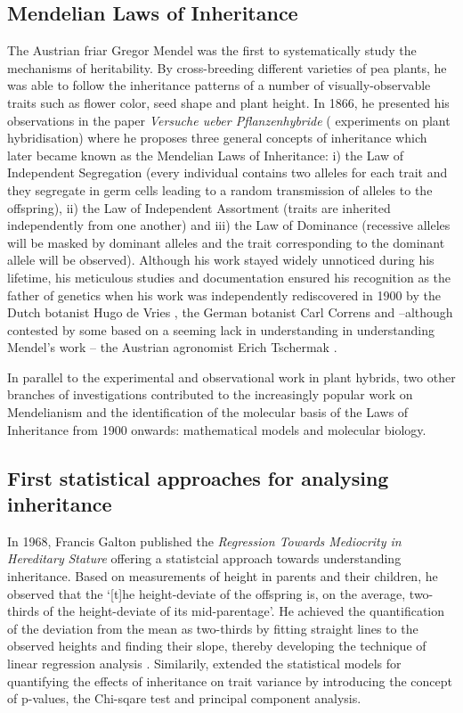 \subsection{Mendelian Laws of Inheritance}
The Austrian friar Gregor Mendel was the first to systematically study the mechanisms of heritability. By cross-breeding different varieties of pea plants, he was able to follow the inheritance patterns of a number of visually-observable traits such as flower color, seed shape and plant height. In 1866, he presented his observations in the paper \textit{Versuche ueber Pflanzenhybride} ( experiments on plant hybridisation) where he proposes three general concepts of inheritance which later became known as the Mendelian Laws of Inheritance: i) the Law of Independent Segregation (every individual contains two alleles for each trait and they segregate in germ cells leading to a random transmission of alleles to the offspring), ii) the Law of Independent Assortment (traits are inherited independently from one another) and iii) the Law of Dominance (recessive alleles will be masked by dominant alleles and the trait corresponding to the dominant allele will be observed). Although his work stayed widely unnoticed during his lifetime, his meticulous studies and documentation ensured his recognition as the father of genetics when his work was independently rediscovered in 1900 by the Dutch  botanist Hugo de Vries \citep{deVries1900,Hannah1950}, the German botanist Carl Correns \citep{Correns1900,Pierncik1950} and --although contested by some based on a seeming lack in understanding in understanding Mendel's work \citep{Monaghan1986,Floyd1987}-- the Austrian agronomist Erich Tschermak \citep{Tschermak1900}. 

In parallel to the experimental and observational work in plant hybrids, two other branches of investigations contributed to the increasingly popular work on Mendelianism and the identification of the molecular basis of the Laws of Inheritance from 1900 onwards: mathematical models and molecular biology. 

\subsection{First statistical approaches for analysing inheritance}
In 1968, Francis Galton published the \textit{Regression Towards Mediocrity in Hereditary} \textit{Stature} offering a statistcial approach towards understanding inheritance. Based on measurements of height in parents and their children, he observed that the `[t]he height-deviate of the offspring is, on the average, two-thirds of the height-deviate of its mid-parentage'. He achieved the quantification of the deviation from the mean as two-thirds by fitting straight lines to the observed heights and finding their slope, thereby developing the technique of linear regression analysis \citep{Tschermak1900}. Similarily, \citet{Pearson1900,Pearson1901} extended the statistical models for quantifying the effects of inheritance on trait variance by introducing the concept of p-values, the Chi-sqare test and principal component analysis. 

